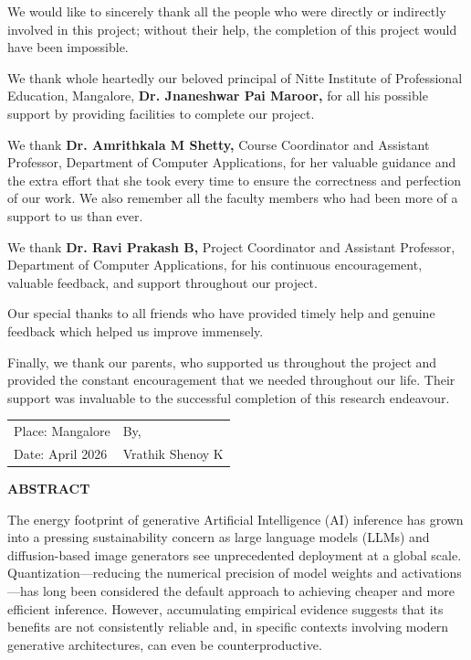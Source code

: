 \documentclass[12pt, a4paper]{report}
\begin{document}
We would like to sincerely thank all the people who were directly or indirectly involved in this project; without their help, the completion of this project would have been impossible.

We thank whole heartedly our beloved principal of Nitte Institute of Professional Education, Mangalore, \textbf{Dr. Jnaneshwar Pai Maroor,} for all his possible support by providing facilities to complete our project.

We thank \textbf{Dr. Amrithkala M Shetty,} Course Coordinator and Assistant Professor, Department of Computer Applications, for her valuable guidance and the extra effort that she took every time to ensure the correctness and perfection of our work. We also remember all the faculty members who had been more of a support to us than ever.

We thank \textbf{Dr. Ravi Prakash B,} Project Coordinator and Assistant Professor, Department of Computer Applications, for his continuous encouragement, valuable feedback, and support throughout our project.

Our special thanks to all friends who have provided timely help and genuine feedback which helped us improve immensely.

Finally, we thank our parents, who supported us throughout the project and provided the constant encouragement that we needed throughout our life. Their support was invaluable to the successful completion of this research endeavour.

\vspace{30pt}
\noindent
\begin{tabular}{@{}p{}p{}@{}}
  Place: Mangalore & By, \\[8pt]
  Date: April 2026 & Vrathik Shenoy K \\
\end{tabular}

\clearpage
\begin{center}
  {\Large\bfseries ABSTRACT}
\end{center}
\vspace{14pt}

The energy footprint of generative Artificial Intelligence (AI) inference has grown into a pressing sustainability concern as large language models (LLMs) and diffusion-based image generators see unprecedented deployment at a global scale. Quantization---reducing the numerical precision of model weights and activations---has long been considered the default approach to achieving cheaper and more efficient inference. However, accumulating empirical evidence suggests that its benefits are not consistently reliable and, in specific contexts involving modern generative architectures, can even be counterproductive.
\end{document}
